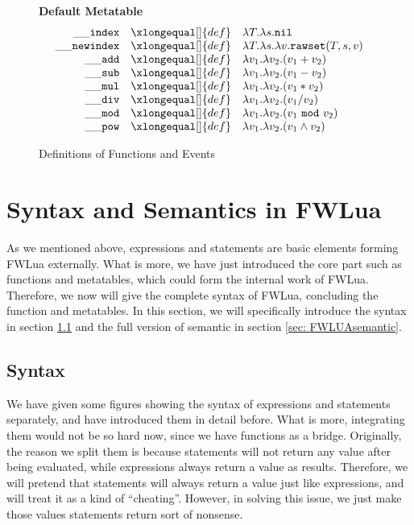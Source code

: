 
\begin{figure}[P]
\caption{Definitions of Functions and Events}
{\bf Default Metatable}
\label{fig:FW2.1metamethods}
\[
\begin{array}{rclcl}
  {\tt \_\_index}  & \xlongequal[]{def} & \aFunction{T}{\aFunction{s}{\tt nil}}\\
  
  {\tt \_\_newindex} & \xlongequal[]{def}  & \aFunction{T}{\aFunction{s}{\aFunction{v}{{\tt rawset}(T,s,v)}}}\\
 {\tt \_\_add}   & \xlongequal[]{def}  & \aFunction{v_1}{\aFunction{v_2}{(v_1+v_2)}} \\
 {\tt \_\_sub}   & \xlongequal[]{def}  & \aFunction{v_1}{\aFunction{v_2}{(v_1-v_2)}} \\
 {\tt \_\_mul}   & \xlongequal[]{def}  & \aFunction{v_1}{\aFunction{v_2}{(v_1*v_2)}} \\
 {\tt \_\_div}   & \xlongequal[]{def}  & \aFunction{v_1}{\aFunction{v_2}{(v_1/v_2)}} \\
 {\tt \_\_mod}   & \xlongequal[]{def}  & \aFunction{v_1}{\aFunction{v_2}{(v_1~{\tt mod}~v_2)}} \\
 {\tt \_\_pow}   & \xlongequal[]{def}  & \aFunction{v_1}{\aFunction{v_2}{(v_1 \wedge v_2)}} \\
         
\end{array}
\]
\end{figure}




\section{Syntax and Semantics in FWLua}\label{sec: syntax and semantic}
As we mentioned above, expressions and statements are basic elements forming FWLua externally. What is more, we have just introduced the core part such as functions and metatables, which could form the internal work of FWLua. Therefore, we now will give the complete syntax of FWLua, concluding the function and metatables. In this section, we will specifically introduce the syntax in section \ref{sec: FWLUAsyntax} and the full version of semantic in section \ref{sec: FWLUAsemantic}.

\subsection{Syntax}\label{sec: FWLUAsyntax}
We have given some figures showing the syntax of expressions and statements separately, and have introduced them in detail before. What is more, integrating them would not be so hard now, since we have functions as a bridge. Originally, the reason we split them is because statements will not return any value after being evaluated, while expressions always return a value as results. Therefore, we will pretend that statements will always return a value just like expressions, and will treat it as a kind of ``cheating''. However, in solving this issue, we just make those values statements return sort of nonsense.

